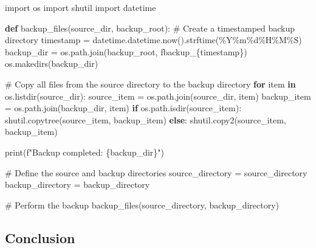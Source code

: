 \documentclass[
  letterpaper,
  DIV=11,
  numbers=noendperiod]{scrreprt}
\newenvironment{Shaded}{\begin{snugshade}}{\end{snugshade}}
\newcommand{\BuiltInTok}[1]{\textcolor[rgb]{0.00,0.23,0.31}{#1}}
\newcommand{\CommentTok}[1]{\textcolor[rgb]{0.37,0.37,0.37}{#1}}
\newcommand{\ControlFlowTok}[1]{\textcolor[rgb]{0.00,0.23,0.31}{\textbf{#1}}}
\newcommand{\ImportTok}[1]{\textcolor[rgb]{0.00,0.46,0.62}{#1}}
\newcommand{\KeywordTok}[1]{\textcolor[rgb]{0.00,0.23,0.31}{\textbf{#1}}}
\newcommand{\NormalTok}[1]{\textcolor[rgb]{0.00,0.23,0.31}{#1}}
\newcommand{\OperatorTok}[1]{\textcolor[rgb]{0.37,0.37,0.37}{#1}}
\newcommand{\SpecialCharTok}[1]{\textcolor[rgb]{0.37,0.37,0.37}{#1}}
\newcommand{\SpecialStringTok}[1]{\textcolor[rgb]{0.13,0.47,0.30}{#1}}
\newcommand{\StringTok}[1]{\textcolor[rgb]{0.13,0.47,0.30}{#1}}
\begin{document}
\begin{Shaded}
\begin{Highlighting}[]
\ImportTok{import}\NormalTok{ os}
\ImportTok{import}\NormalTok{ shutil}
\ImportTok{import}\NormalTok{ datetime}

\KeywordTok{def}\NormalTok{ backup\_files(source\_dir, backup\_root):}
    \CommentTok{\# Create a timestamped backup directory}
\NormalTok{    timestamp }\OperatorTok{=}\NormalTok{ datetime.datetime.now().strftime(}\StringTok{\textquotesingle{}\%Y\%m}\SpecialCharTok{\%d}\StringTok{\%H\%M\%S\textquotesingle{}}\NormalTok{)}
\NormalTok{    backup\_dir }\OperatorTok{=}\NormalTok{ os.path.join(backup\_root, }\SpecialStringTok{f\textquotesingle{}backup\_}\SpecialCharTok{\{}\NormalTok{timestamp}\SpecialCharTok{\}}\SpecialStringTok{\textquotesingle{}}\NormalTok{)}
\NormalTok{    os.makedirs(backup\_dir)}
    
    \CommentTok{\# Copy all files from the source directory to the backup directory}
    \ControlFlowTok{for}\NormalTok{ item }\KeywordTok{in}\NormalTok{ os.listdir(source\_dir):}
\NormalTok{        source\_item }\OperatorTok{=}\NormalTok{ os.path.join(source\_dir, item)}
\NormalTok{        backup\_item }\OperatorTok{=}\NormalTok{ os.path.join(backup\_dir, item)}
        \ControlFlowTok{if}\NormalTok{ os.path.isdir(source\_item):}
\NormalTok{            shutil.copytree(source\_item, backup\_item)}
        \ControlFlowTok{else}\NormalTok{:}
\NormalTok{            shutil.copy2(source\_item, backup\_item)}
    
    \BuiltInTok{print}\NormalTok{(}\SpecialStringTok{f"Backup completed: }\SpecialCharTok{\{}\NormalTok{backup\_dir}\SpecialCharTok{\}}\SpecialStringTok{"}\NormalTok{)}

\CommentTok{\# Define the source and backup directories}
\NormalTok{source\_directory }\OperatorTok{=} \StringTok{\textquotesingle{}source\_directory\textquotesingle{}}
\NormalTok{backup\_directory }\OperatorTok{=} \StringTok{\textquotesingle{}backup\_directory\textquotesingle{}}

\CommentTok{\# Perform the backup}
\NormalTok{backup\_files(source\_directory, backup\_directory)}
\end{Highlighting}
\end{Shaded}

\subsection{Conclusion}\label{conclusion-27}
\end{document}
